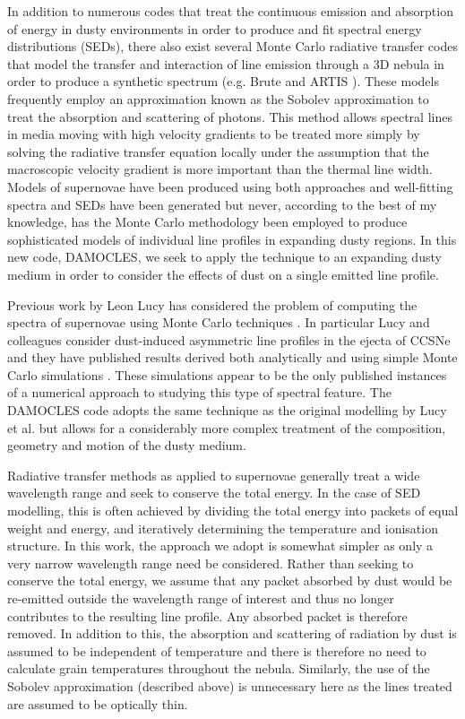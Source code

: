 In addition to numerous codes that treat the continuous emission and absorption of energy in dusty environments in order to produce and fit spectral energy distributions (SEDs), there also exist several Monte Carlo radiative transfer codes that model the transfer and interaction of line emission through a 3D nebula in order to produce a synthetic spectrum (e.g. Brute \citep{Thomas2003} and ARTIS \citep{Kromer2009}).  These  models frequently employ an approximation known as the Sobolev approximation \citep{Sobolev1957} to treat the absorption and scattering of photons.  This method allows spectral lines in media moving with high velocity gradients to be treated more simply by solving the radiative transfer equation locally under the assumption that the macroscopic velocity gradient is more important than the thermal line width.  Models of supernovae have been produced using both approaches and well-fitting spectra and SEDs have been generated but never, according to the best of my knowledge, has the Monte Carlo methodology been employed to produce sophisticated models of individual line profiles in expanding dusty regions.  In this new code, DAMOCLES, we seek to apply the technique to an expanding dusty medium in order to consider the effects of dust on a single emitted line profile.  

Previous work by Leon Lucy has considered the problem of computing the spectra of supernovae using Monte Carlo techniques \citep{Lucy1987,Lucy1999,Lucy2002,Lucy2003,Lucy2005c,Lucy2005b}.  In particular Lucy and colleagues consider dust-induced asymmetric line profiles in the ejecta of CCSNe and they have published results derived both analytically and using simple Monte Carlo simulations \citep{Lucy1989,Lucy1991}.  These simulations appear to be the only published instances of a numerical approach to studying this type of spectral feature.  The DAMOCLES code adopts the same technique as the original modelling by Lucy et al. but allows for a considerably more complex treatment of the composition, geometry and motion of the dusty medium.

Radiative transfer methods as applied to supernovae generally treat a wide wavelength range and seek to conserve the total energy.  In the case of SED modelling, this is often achieved by dividing the total energy into packets of equal weight and energy, and iteratively determining the temperature and ionisation structure.  In this work, the approach we adopt is somewhat simpler as only a very narrow wavelength range need be considered.  Rather than seeking to conserve the total energy, we assume that any packet absorbed by dust would be re-emitted outside the wavelength range of interest and thus no longer contributes to the resulting line profile.  Any absorbed packet is therefore removed.  In addition to this, the absorption and scattering of radiation by dust is assumed to be independent of temperature and there is therefore no need to calculate grain temperatures throughout the nebula.  Similarly, the use of the Sobolev approximation (described above) is unnecessary here as the lines treated are assumed to be optically thin. 

